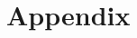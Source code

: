 \documentclass[runningheads]{llncs}
\begin{document}

\small{
    
}
%
\newpage

\section{Appendix}

\end{document}

